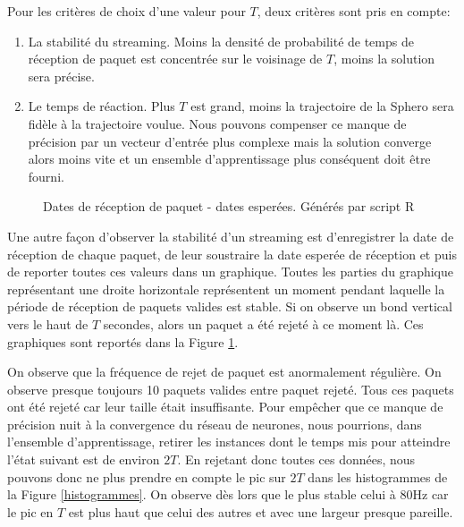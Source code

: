 Pour les critères de choix d'une valeur pour $T$, deux critères sont pris en compte:
\begin{enumerate}
 \item La stabilité du streaming. Moins la densité de probabilité de temps de réception de paquet est concentrée sur le voisinage de $T$, moins la solution sera précise.
 \item Le temps de réaction. Plus $T$ est grand, moins la trajectoire de la Sphero sera fidèle à la trajectoire voulue.
 Nous pouvons compenser ce manque de précision par un vecteur d'entrée plus complexe mais la solution converge alors moins vite et un ensemble d'apprentissage plus conséquent doit être fourni.
\end{enumerate}

\begin{figure}
 \centering
 \caption{Dates de réception de paquet - dates esperées. Générés par script R}
 \label{befores}
\end{figure}
Une autre façon d'observer la stabilité d'un streaming est d'enregistrer la date de réception de chaque paquet, de leur soustraire la date esperée de réception et puis de reporter toutes ces valeurs dans un graphique.
Toutes les parties du graphique représentant une droite horizontale représentent un moment pendant laquelle la période de réception de paquets valides est stable.
Si on observe un bond vertical vers le haut de $T$ secondes, alors un paquet a été rejeté à ce moment là.
Ces graphiques sont reportés dans la Figure \ref{befores}.

On observe que la fréquence de rejet de paquet est anormalement régulière.
On observe presque toujours 10 paquets valides entre paquet rejeté.
Tous ces paquets ont été rejeté car leur taille était insuffisante.
Pour empêcher que ce manque de précision nuit à la convergence du réseau de neurones, nous pourrions, dans l'ensemble d'apprentissage, retirer les instances dont le temps mis pour atteindre l'état suivant est de environ $2T$.
En rejetant donc toutes ces données, nous pouvons donc ne plus prendre en compte le pic sur $2T$ dans les histogrammes de la Figure \ref{histogrammes}.
On observe dès lors que le plus stable celui à 80Hz car le pic en $T$ est plus haut que celui des autres et avec une largeur presque pareille.